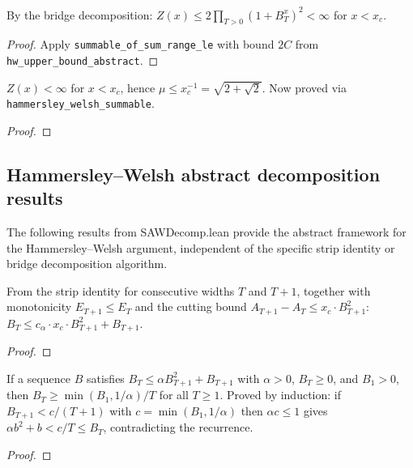 \begin{theorem}\label{thm:hw_bound}
\leanok
{}
  By the bridge decomposition:
  $Z(x) \leq 2 \prod_{T>0} (1 + B_T^x)^2 < \infty$ for $x < x_c$.
\end{theorem}
\begin{proof}
\leanok
{}
  Apply \texttt{summable\_of\_sum\_range\_le} with
  bound $2C$ from \texttt{hw\_upper\_bound\_abstract}.
\end{proof}

\begin{theorem}\label{thm:upper_bound}
\leanok
{}
  $Z(x) < \infty$ for $x < x_c$, hence $\mu \leq x_c^{-1} = \sqrt{2+\sqrt{2}}$.
  Now proved via \texttt{hammersley\_welsh\_summable}.
\end{theorem}
\begin{proof}
\leanok
\end{proof}


\subsection{Hammersley--Welsh abstract decomposition results}

The following results from SAWDecomp.lean provide the abstract framework
for the Hammersley--Welsh argument, independent of the specific strip
identity or bridge decomposition algorithm.

\begin{theorem}\label{thm:hw_recurrence}
\leanok
{}
  From the strip identity for consecutive widths $T$ and $T{+}1$,
  together with monotonicity $E_{T+1} \leq E_T$ and the cutting bound
  $A_{T+1} - A_T \leq x_c \cdot B_{T+1}^2$:
  $B_T \leq c_\alpha \cdot x_c \cdot B_{T+1}^2 + B_{T+1}$.
\end{theorem}
\begin{proof}
\leanok
\end{proof}

\begin{theorem}\label{thm:quadratic_lower}
\leanok
  If a sequence $B$ satisfies $B_T \leq \alpha B_{T+1}^2 + B_{T+1}$
  with $\alpha > 0$, $B_T \geq 0$, and $B_1 > 0$, then
  $B_T \geq \min(B_1, 1/\alpha) / T$ for all $T \geq 1$.
  Proved by induction: if $B_{T+1} < c/(T{+}1)$ with
  $c = \min(B_1, 1/\alpha)$ then $\alpha c \leq 1$ gives
  $\alpha b^2 + b < c/T \leq B_T$, contradicting the recurrence.
\end{theorem}
\begin{proof}
\leanok
\end{proof}

